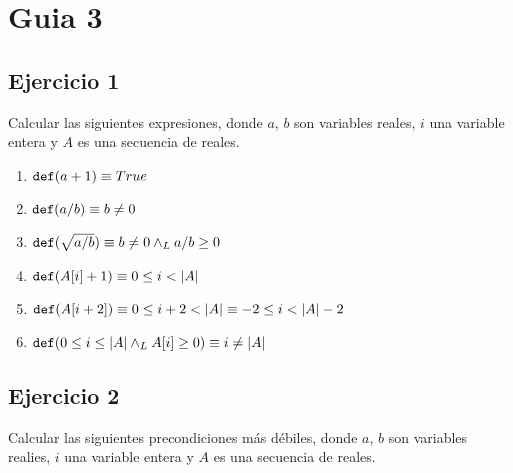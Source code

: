 





\maketitle
\newpage

\tableofcontents
\newpage

\section{Guia 3}

\subsection{Ejercicio 1}
Calcular las siguientes expresiones, donde $a$, $b$ son variables reales, $i$ una variable entera y $A$ es una secuencia de reales.

\begin{multicols}{2}
    \begin{enumerate}[label=\alph*)]
        \item $\text{\normalfont\ttfamily def}(a + 1) \equiv True$
        \item $\text{\normalfont\ttfamily def}(a / b) \equiv b \neq 0$
        \item $\text{\normalfont\ttfamily def}(\sqrt{a / b}) \equiv b \neq 0 \land _L a / b \geq 0$
        \item $\text{\normalfont\ttfamily def}(A[i] + 1) \equiv 0 \leq i < |A|$
        \item $\text{\normalfont\ttfamily def}(A[i + 2]) \equiv 0 \leq i + 2 < |A| \equiv -2 \leq i < |A| - 2$
        \item $\text{\normalfont\ttfamily def}(0 \leq i \leq |A| \land _L A[i] \geq 0) \equiv i \neq |A|$
    \end{enumerate}
\end{multicols}

\subsection{Ejercicio 2}
Calcular las siguientes precondiciones más débiles, donde $a$, $b$ son variables realies, $i$ una variable entera y $A$ es una secuencia de reales.

